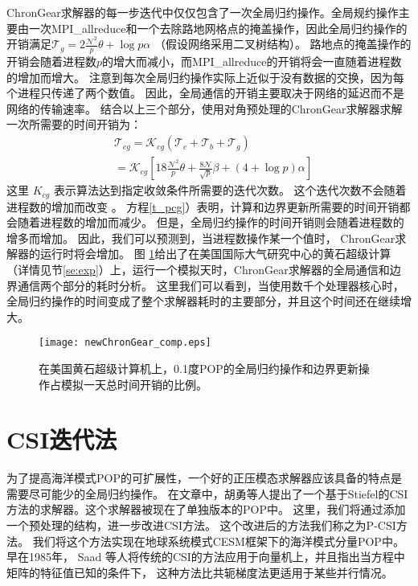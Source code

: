  
ChronGear求解器的每一步迭代中仅仅包含了一次全局归约操作。全局规约操作主要由一次MPI\_allreduce和一个去除路地网格点的掩盖操作，因此全局归约操作的开销满足$\mathcal{T}_g= 2\frac{\mathcal{N}^2}{p}\theta + \log p \alpha$ （假设网络采用二叉树结构）。 
路地点的掩盖操作的开销会随着进程数$p$的增大而减小，而MPI\_allreduce的开销将会一直随着进程数的增加而增大。 
注意到每次全局归约操作实际上近似于没有数据的交换，因为每个进程只传递了两个数值。
因此，全局通信的开销主要取决于网络的延迟而不是网络的传输速率。
结合以上三个部分，使用对角预处理的ChronGear求解器求解一次所需要的时间开销为：
\begin{eqnarray}
\label{t_pcg}
&\mathcal{T}_{cg}=\mathcal{K}_{cg} (\mathcal{T}_c + \mathcal{T}_b+\mathcal{T}_g )\nonumber \\
&=\mathcal{K}_{cg} [18 \frac{\mathcal{N}^2}{p}\theta + \frac{8\mathcal{N}}{\sqrt{p}}\beta +(4+\log p)\alpha]
\end{eqnarray}
这里 $K_{cg}$ 表示算法达到指定收敛条件所需要的迭代次数。
这个迭代次数不会随着进程数的增加而改变 \cite{hu2013scalable}。 
方程\ref{t_pcg}）表明，计算和边界更新所需要的时间开销都会随着进程数的增加而减少。 
但是，全局归约操作的时间开销则会随着进程数的增多而增加。 
因此，我们可以预测到，当进程数操作某一个值时， ChronGear求解器的运行时将会增加。 
图 \ref{fig:ChronGearCOMP}给出了在美国国际大气研究中心的黄石超级计算（详情见节\ref{se:exp}）上，运行一个模拟天时，ChronGear求解器的全局通信和边界通信两个部分的耗时分析。 
这里我们可以看到，当使用数千个处理器核心时，全局归约操作的时间变成了整个求解器耗时的主要部分，并且这个时间还在继续增大。 
 


\begin{figure}[!t]
\begin{center}
	\texttt{[image: newChronGear\_comp.eps]}
\caption[] {在美国黄石超级计算机上，0.1度POP的全局归约操作和边界更新操作占模拟一天总时间开销的比例。}
\label{fig:ChronGearCOMP}
\end{center}
\end{figure}
 

\section{CSI迭代法}
\label{sec:barocsi}

为了提高海洋模式POP的可扩展性，一个好的正压模态求解器应该具备的特点是需要尽可能少的全局归约操作。 
在文章\cite{hu2013scalable}中，胡勇等人提出了一个基于Stiefel的CSI方法的求解器。这个求解器被现在了单独版本的POP中。 
这里，我们将通过添加一个预处理的结构，进一步改进CSI方法。
这个改进后的方法我们称之为P-CSI方法。 我们将这个方法实现在地球系统模式CESM框架下的海洋模式分量POP中。 
早在1985年， Saad 等人\cite{saad1985solving}将传统的CSI的方法应用于向量机上，并且指出当方程中矩阵的特征值已知的条件下， 这种方法比共轭梯度法更适用于某些并行情况。 



